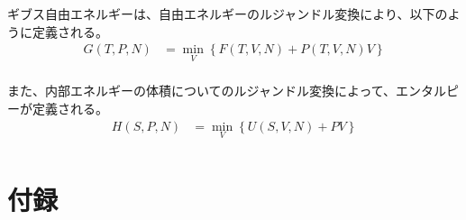 \documentclass[a4paper,11pt]{jsarticle}
\numberwithin{equation}{section}
\begin{document}
ギブス自由エネルギーは、自由エネルギーのルジャンドル変換により、以下のように定義される。
\begin{align}
    G(T,P,N) &= \min_{V} \left\{ F(T,V,N) + P(T,V,N)V \right\}\\
\end{align}

また、内部エネルギーの体積についてのルジャンドル変換によって、エンタルピーが定義される。
\begin{align}
    H(S,P,N) &= \min_{V} \left\{ U(S,V,N) + PV \right\}\\
\end{align}





\section{付録}
\end{document}
